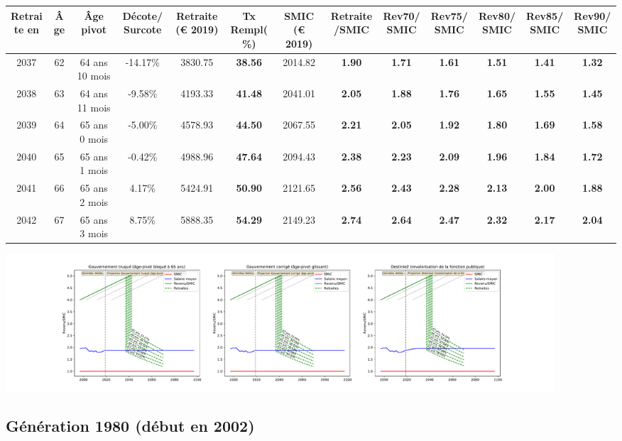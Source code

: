 { \scriptsize \begin{center} 
\begin{tabular}[htb]{|c|c||c|c||c|c||c||c|c|c|c|c|c|} 
\hline 
 Retraite en &  Âge &  Âge pivot &  Décote/Surcote &  Retraite (\euro{} 2019) &  Tx Rempl(\%) &  SMIC (\euro{} 2019) &  Retraite/SMIC &  Rev70/SMIC &  Rev75/SMIC &  Rev80/SMIC &  Rev85/SMIC &  Rev90/SMIC \\ 
\hline \hline 
 2037 &  62 &  64 ans 10 mois &  -14.17\% &  3830.75 &  {\bf 38.56} &  2014.82 &  {\bf 1.90} &  {\bf 1.71} &  {\bf 1.61} &  {\bf 1.51} &  {\bf 1.41} &  {\bf 1.32} \\ 
\hline 
 2038 &  63 &  64 ans 11 mois &  -9.58\% &  4193.33 &  {\bf 41.48} &  2041.01 &  {\bf 2.05} &  {\bf 1.88} &  {\bf 1.76} &  {\bf 1.65} &  {\bf 1.55} &  {\bf 1.45} \\ 
\hline 
 2039 &  64 &  65 ans 0 mois &  -5.00\% &  4578.93 &  {\bf 44.50} &  2067.55 &  {\bf 2.21} &  {\bf 2.05} &  {\bf 1.92} &  {\bf 1.80} &  {\bf 1.69} &  {\bf 1.58} \\ 
\hline 
 2040 &  65 &  65 ans 1 mois &  -0.42\% &  4988.96 &  {\bf 47.64} &  2094.43 &  {\bf 2.38} &  {\bf 2.23} &  {\bf 2.09} &  {\bf 1.96} &  {\bf 1.84} &  {\bf 1.72} \\ 
\hline 
 2041 &  66 &  65 ans 2 mois &  4.17\% &  5424.91 &  {\bf 50.90} &  2121.65 &  {\bf 2.56} &  {\bf 2.43} &  {\bf 2.28} &  {\bf 2.13} &  {\bf 2.00} &  {\bf 1.88} \\ 
\hline 
 2042 &  67 &  65 ans 3 mois &  8.75\% &  5888.35 &  {\bf 54.29} &  2149.23 &  {\bf 2.74} &  {\bf 2.64} &  {\bf 2.47} &  {\bf 2.32} &  {\bf 2.17} &  {\bf 2.04} \\ 
\hline 
\hline 
\end{tabular} 
\end{center} } 

 \begin{center}\includegraphics[width=0.9\textwidth]{fig/Ascendant45_1975_22_dest_retraite.pdf}\end{center} \label{fig/Ascendant45_1975_22_dest_retraite.pdf} 

\newpage 
 
\subsection{Génération 1980 (début en 2002)} 

